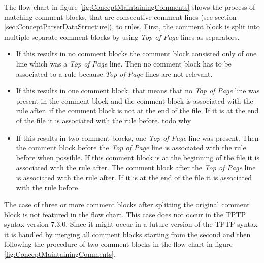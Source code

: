 The flow chart in figure \ref{fig:ConceptMaintainingComments} shows the process of matching comment blocks, that are consecutive comment lines (see section \ref{sec:ConceptParserDataStructure}),  to rules.
First, the comment block is split into multiple separate comment blocks by using \textit{Top of Page} lines as separators.
\begin{itemize}%
	\item If this results in no comment blocks the comment block consisted only of one line which was a \textit{Top of Page} line.
	Then no comment block has to be associated to a rule because \textit{Top of Page} lines are not relevant.
	\item If this results in one comment block, that means that no \textit{Top of Page} line was present in the comment block and the comment block is associated with the rule after, if the comment block is not at the end of the file.
	If it is at the end of the file it is associated with the rule before. todo why
	\item If this results in two comment blocks, one \textit{Top of Page} line was present.
	Then the comment block before the \textit{Top of Page} line is associated with the rule before when possible.
	If this comment block is at the beginning of the file it is associated with the rule after.
	The comment block after the \textit{Top of Page} line is associated with the rule after.
	If it is at the end of the file it is associated with the rule before.
\end{itemize}
The case of three or more comment blocks after splitting the original comment block is not featured in the flow chart.
This case does not occur in the \ac{TPTP} syntax version 7.3.0.
Since it might occur in a future version of the \ac{TPTP} syntax it is handled by merging all comment blocks starting from the second and then following the procedure of two comment blocks in the flow chart in figure \ref{fig:ConceptMaintainingComments}.

